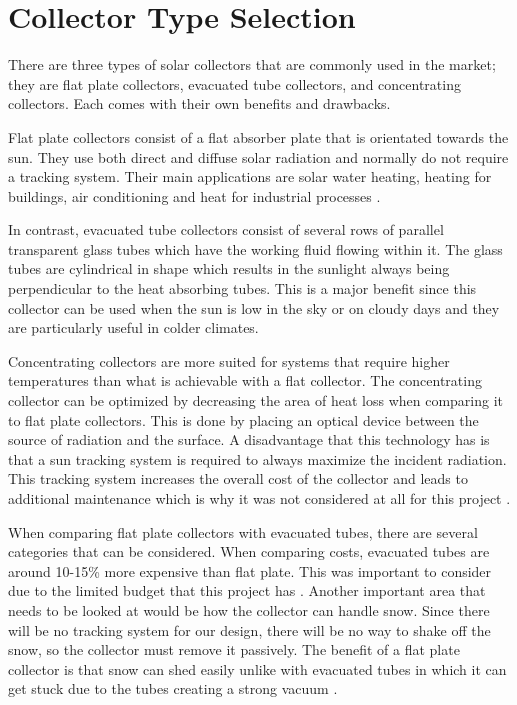 \medskip
\section{Collector Type Selection}

There are three types of solar collectors that are commonly used in the market; they are flat plate collectors, evacuated tube collectors, and concentrating collectors. Each comes with their own benefits and drawbacks.

\medskip
Flat plate collectors consist of a flat absorber plate that is orientated towards the sun. They use both direct and diffuse solar radiation and normally do not require a tracking system. Their main applications are solar water heating, heating for buildings, air conditioning and heat for industrial processes \cite{solar_thermal_energy}.

\medskip
In contrast, evacuated tube collectors consist of several rows of parallel transparent glass tubes which have the working fluid flowing within it. The glass tubes are cylindrical in shape which results in the sunlight always being perpendicular to the heat absorbing tubes. This is a major benefit since this collector can be used when the sun is low in the sky or on cloudy days and they are particularly useful in colder climates.

\medskip
Concentrating collectors are more suited for systems that require higher temperatures than what is achievable with a flat collector. The concentrating collector can be optimized by decreasing the area of heat loss when comparing it to flat plate collectors. This is done by placing an optical device between the source of radiation and the surface. A disadvantage that this technology has is that a sun tracking system is required to always maximize the incident radiation. This tracking system increases the overall cost of the collector and leads to additional maintenance which is why it was not considered at all for this project \cite{solar_thermal_energy}.

\medskip
When comparing flat plate collectors with evacuated tubes, there are several categories that can be considered. When comparing costs, evacuated tubes are around 10-15\% more expensive than flat plate. This was important to consider due to the limited budget that this project has \cite{flat_plate}. Another important area that needs to be looked at would be how the collector can handle snow. Since there will be no tracking system for our design, there will be no way to shake off the snow, so the collector must remove it passively. The benefit of a flat plate collector is that snow can shed easily unlike with evacuated tubes in which it can get stuck due to the tubes creating a strong vacuum \cite{flat_plate}.


